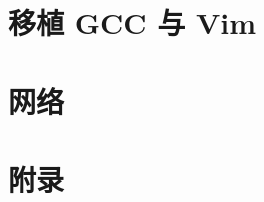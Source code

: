 \documentclass[12pt, a4paper, openany]{book}
\begin{document}






\part{移植 GCC 与 Vim}






\part{网络}






\appendix
\part{附录}




\end{document}

